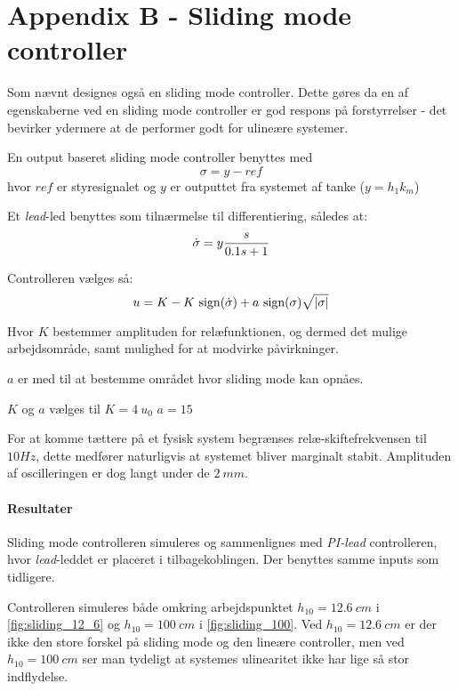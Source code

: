 \section*{Appendix B - Sliding mode controller}
\newcommand{\sign}{\mbox{sign}}
Som nævnt designes også en sliding mode controller.
Dette gøres da en af egenskaberne ved en sliding mode controller er god respons
på forstyrrelser - det bevirker ydermere at de performer godt for ulineære
systemer.

En output baseret sliding mode controller benyttes med
\begin{equation*}
\sigma = y - ref
\end{equation*}
hvor $ref$ er styresignalet og $y$ er outputtet fra systemet af tanke ($y = h_1
k_m$)

Et \emph{lead}-led benyttes som tilnærmelse til differentiering, således at:
\begin{equation*}
\dot\sigma = y \frac{s}{0.1s + 1}
\end{equation*}

Controlleren vælges så:
\begin{equation*}
u = K - K ~\sign( \diff\sigma ) + a ~ \sign(\sigma)\sqrt{\abs{\sigma}}
\end{equation*}

Hvor $K$ bestemmer amplituden for relæfunktionen, og dermed det mulige
arbejdsområde, samt mulighed for at modvirke påvirkninger.

$a$ er med til at bestemme området hvor sliding mode kan opnåes.

$K$ og $a$ vælges til $K = 4~u_0$ $a=15$

For at komme tættere på et fysisk system begrænses relæ-skiftefrekvensen til
$10Hz$, dette medfører naturligvis at systemet bliver marginalt stabit.
Amplituden af oscilleringen er dog langt under de $2~mm$.

\paragraph{ Resultater }
Sliding mode controlleren simuleres og sammenlignes med \emph{PI-lead}
controlleren, hvor \emph{lead}-leddet er placeret i tilbagekoblingen. Der
benyttes samme inputs som tidligere.

Controlleren simuleres både omkring arbejdspunktet $h_{10} = 12.6~cm$ i
\ref{fig:sliding_12_6} og $h_{10} = 100~cm$ i \ref{fig:sliding_100}.
Ved $h_{10} = 12.6~cm$ er der ikke den store forskel på sliding mode og den
lineære controller, men ved $h_{10} = 100~cm$ ser man tydeligt at systemes
ulinearitet ikke har lige så stor indflydelse.

